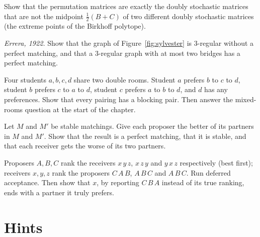 \begin{exercise}[$\star\star$]\label{ex:birkhoffext}
Show that the permutation matrices are exactly the doubly stochastic matrices that are not the midpoint $\frac12(B+C)$ of two different doubly
stochastic matrices (the extreme points of the Birkhoff polytope).
\end{exercise}

\begin{exercise}[$\star\star$]\label{ex:errera}
\emph{Errera, 1922.} Show that the graph of Figure~\ref{fig:sylvester} is $3$-regular without a perfect matching, and that a $3$-regular graph with at most
two bridges has a perfect matching.
\end{exercise}

\begin{exercise}[$\star$]\label{ex:roommates}
Four students $a,b,c,d$ share two double rooms. Student $a$ prefers $b$ to $c$ to $d$, student $b$ prefers $c$ to $a$ to $d$, student $c$ prefers $a$ to $b$ to $d$,
and $d$ has any preferences. Show that every pairing has a blocking pair. Then answer the mixed-rooms question at the start of the chapter.
\end{exercise}

\begin{exercise}[$\star\star$]\label{ex:stablelattice}
Let $M$ and $M'$ be stable matchings. Give each proposer the better of its partners in $M$ and $M'$. Show that the result is a perfect matching,
that it is stable, and that each receiver gets the worse of its two partners.
\end{exercise}

\begin{exercise}[$\star\star$]\label{ex:lying}
Proposers $A,B,C$ rank the receivers $x\,y\,z$, $x\,z\,y$ and $y\,x\,z$ respectively (best first); receivers $x,y,z$ rank the proposers $C\,A\,B$, $A\,B\,C$ and $A\,B\,C$.
Run deferred acceptance. Then show that $x$, by reporting $C\,B\,A$ instead of its true ranking, ends with a partner it truly prefers.
\end{exercise}

\section{Hints}


